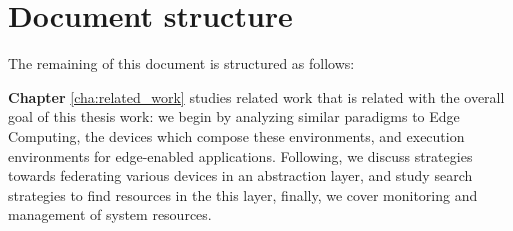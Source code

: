 \section{Document structure}

The remaining of this document is structured as follows: 

\textbf{Chapter} \ref{cha:related_work} studies related work that is related with the overall goal of this thesis work: we begin by analyzing similar paradigms to Edge Computing, the devices which compose these environments, and execution environments for edge-enabled applications. Following, we discuss strategies towards federating various devices in an abstraction layer, and study search strategies to find resources in the this layer, finally, we cover monitoring and management of system resources.

